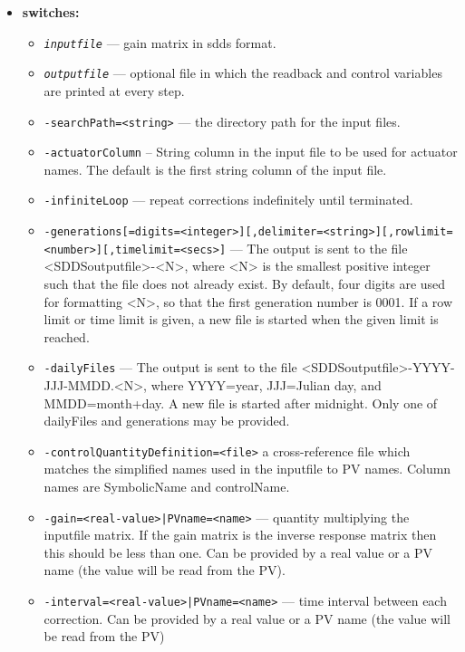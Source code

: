 \begin{itemize}
%
\item {\bf switches:}
%
%
    \begin{itemize}
%
        \item {\tt {\em inputfile}} --- gain matrix in sdds format.
        \item {\tt {\em outputfile}} --- optional file in which the readback and
               control variables are printed at every step.
        \item {\tt -searchPath=<string>} --- the directory path for the input files.
        \item {\tt -actuatorColumn} -- String column in the input file to be used for
               actuator names. The default is the first string column
               of the input file.
        \item {\tt -infiniteLoop} --- repeat corrections indefinitely until terminated.
        \item {\tt -generations[=digits=<integer>][,delimiter=<string>][,rowlimit=<number>][,timelimit=<secs>]} --- The output is sent to the file <SDDSoutputfile>-<N>, where <N> is
               the smallest positive integer such that the file does not already
               exist. By default, four digits are used for formatting <N>, so that
               the first generation number is 0001.  If a row limit or time limit
               is given, a new file is started when the given limit is reached.
        \item {\tt -dailyFiles} --- The output is sent to the file <SDDSoutputfile>-YYYY-JJJ-MMDD.<N>,
               where YYYY=year, JJJ=Julian day, and MMDD=month+day.  A new file is
               started after midnight. Only one of dailyFiles and generations may be provided.
        \item {\tt -controlQuantityDefinition=<file>}
               a cross-reference file which matches the simplified
               names used in the inputfile to PV names.
               Column names are SymbolicName and controlName.
        \item {\tt -gain=<real-value>|PVname=<name>} --- quantity multiplying the inputfile matrix.
               If the gain matrix is the inverse response matrix
               then this should be less than one. Can be provided by a real value or a PV name (the value will be read from the PV).
        \item {\tt -interval=<real-value>|PVname=<name>} --- time interval between each correction. Can be provided by a real value or a PV name (the value will be read from the PV)

\end{itemize}
\end{itemize}
